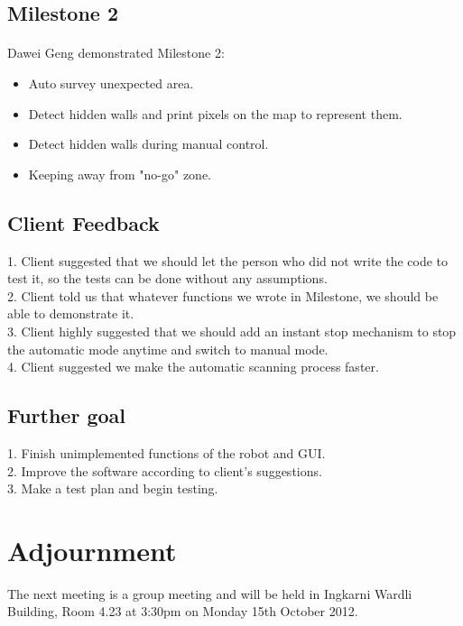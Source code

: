 \documentclass[11pt, a4paper]{article}
\begin{document}
\subsection{Milestone 2}
\paragraph{} Dawei Geng demonstrated Milestone 2:
\begin{itemize}
\item Auto survey unexpected area.
\item Detect hidden walls and print pixels on the map to represent them.
\item Detect hidden walls during manual control.
\item Keeping away from "no-go" zone.

\end{itemize}

\subsection{Client Feedback}
1. Client suggested that we should let the person who did not write the code to test it, so the tests can be done without any assumptions.\\
2. Client told us that whatever functions we wrote in Milestone, we should be able to demonstrate it.\\
3. Client highly suggested that we should add an instant stop mechanism to stop the automatic mode anytime and switch to manual mode.\\
4. Client suggested we make the automatic scanning process faster.


\subsection{Further goal}
1. Finish unimplemented functions of the robot and GUI.\\
2. Improve the software according to client's suggestions.\\
3. Make a test plan and begin testing. \\

\section{Adjournment}
The next meeting is a group meeting and will be held in Ingkarni Wardli Building, Room 4.23 at 3:30pm on Monday 15th October 2012.

\vspace*{10pt}
\end{document}
